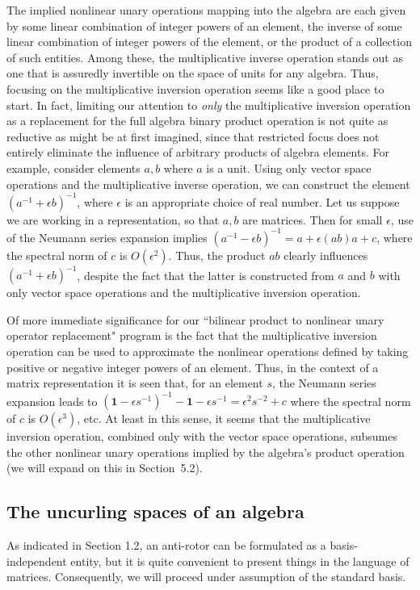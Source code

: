 \documentclass{amsart}
\numberwithin{equation}{section}
\theoremstyle{definition}
\numberwithin{theorem}{section}
\begin{document}
The implied nonlinear unary operations mapping into the algebra are each given by some linear combination of integer powers of an element, the inverse of some linear combination of integer powers of the element, or the product of a collection of such entities.  Among these, the multiplicative inverse operation stands out as one that is assuredly invertible on the space of units for any algebra.   Thus, focusing on the multiplicative inversion operation seems like a good place to start.  In fact, limiting our attention to {\it only} the multiplicative inversion operation as a replacement for the full algebra binary product operation is not quite as reductive as might be at first imagined, since that restricted focus does not entirely eliminate the influence of arbitrary products of algebra elements.  For example, consider elements $a,b$ where $a$ is a unit.  Using only vector space operations and the multiplicative inverse operation, we can construct the element $(a^{-1}+\epsilon b)^{-1}$, where $\epsilon$ is an appropriate choice of real number.  Let us suppose we are working in a representation, so that $a,b$ are matrices.  Then for small $\epsilon$, use of the \mbox{Neumann} series expansion implies $(a^{-1}-\epsilon b)^{-1} = a+\epsilon(ab)a+c$, where the spectral norm of $c$ is $O(\epsilon^2)$.  Thus, the product $ab$ clearly influences $(a^{-1}+\epsilon b)^{-1}$, despite the fact that the latter is constructed from $a$ and $b$ with only vector space operations and the multiplicative inversion operation.  

Of more immediate significance for our ``bilinear product to nonlinear unary operator replacement" program is the fact that the multiplicative inversion operation can be used to approximate the nonlinear operations defined by taking positive or negative integer powers of an element.  Thus, in the context of a matrix representation it is seen that, for an element $s$, the Neumann series expansion leads to \mbox{$(\mathbf{1}-\epsilon s^{- 1})^{-1} - \mathbf{1}- \epsilon s^{-1} = \epsilon^2 s^{-2} + c$} where the spectral norm of $c$ is $O(\epsilon^3)$, etc.  At least in this sense, it seems that the multiplicative inversion operation, combined only with the vector space operations, subsumes the other nonlinear unary operations implied by the algebra's product operation (we will expand on this in \mbox{Section 5.2}).  
 
      \subsection{The uncurling spaces of an algebra} As indicated in Section 1.2, an anti-rotor can be formulated as a basis-independent entity, but it is quite convenient to present things in the language of matrices.  Consequently, we will proceed under assumption of the standard basis.     
       
\end{document}
